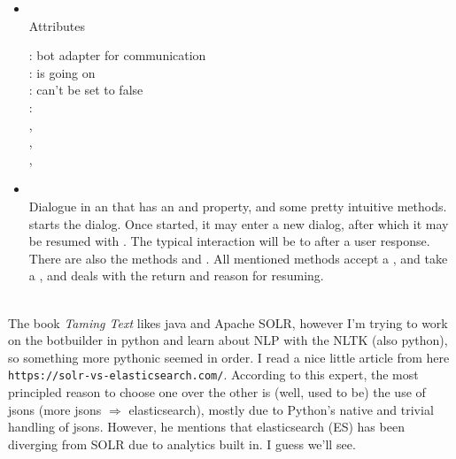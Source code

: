 \documentclass{article}
\begin{document}

\begin{itemize}

\item {}\\
    Attributes
    \begin{itemize}
        : bot adapter for communication \\
        : is going on  \\
        : can't be set to false \\
        :  \\
        , \\
        , \\
        , \\
    \end{itemize}

\end{itemize}

\begin{itemize}

\item {}\\
    Dialogue in an  that has an  and  property, and some pretty intuitive methods.   starts the dialog.  Once started, it may enter a new dialog, after which it may be resumed with .  The typical interaction will be to  after a user response.  There are also the methods  and .  All mentioned methods accept a ,  and  take a , and  deals with the return and reason for resuming.

\end{itemize}

 \\

The book {\it Taming Text} likes java and Apache SOLR, however I'm trying to work on the botbuilder in python and learn about NLP with the NLTK (also python), so something more pythonic seemed in order.  I read a nice little article from here \verb|https://solr-vs-elasticsearch.com/|.  According to this expert, the most principled reason to choose one over the other is (well, used to be) the use of jsons (more jsons $\Rightarrow$ elasticsearch), mostly due to Python's native and trivial handling of jsons.  However, he mentions that elasticsearch (ES) has been diverging from SOLR due to analytics built in.  I guess we'll see.
\end{document}
